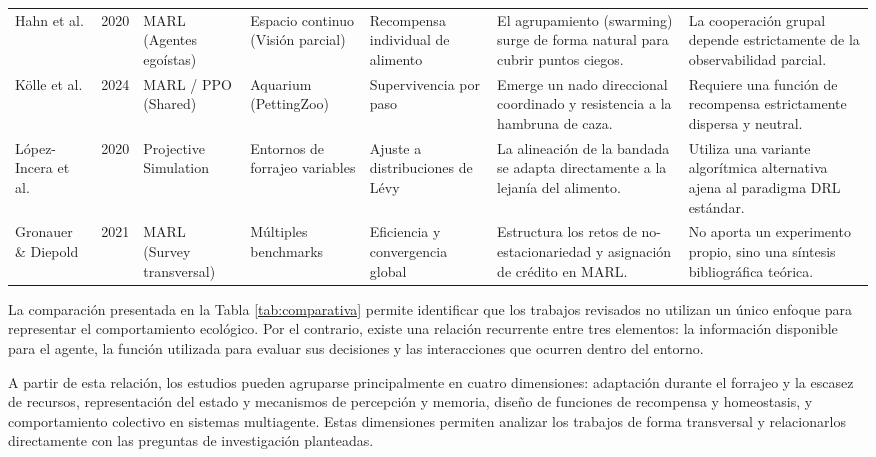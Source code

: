 \documentclass[conference]{IEEEtran}
\begin{document}
\begin{table}[tbp]
\begin{tabular}{p{1.6cm} c p{2.0cm} p{2.0cm} p{2.2cm} p{3.5cm} p{3.4cm}}
\addlinespace

Hahn et al. \cite{Paper18} &
2020 &
MARL (Agentes egoístas) &
Espacio continuo (Visión parcial) &
Recompensa individual de alimento &
El agrupamiento (swarming) surge de forma natural para cubrir puntos ciegos. &
La cooperación grupal depende estrictamente de la observabilidad parcial. \\

\addlinespace

Kölle et al. \cite{Paper19} &
2024 &
MARL / PPO (Shared) &
Aquarium (PettingZoo) &
Supervivencia por paso &
Emerge un nado direccional coordinado y resistencia a la hambruna de caza. &
Requiere una función de recompensa estrictamente dispersa y neutral. \\

\addlinespace

López-Incera et al. \cite{Paper20} &
2020 &
Projective Simulation &
Entornos de forrajeo variables &
Ajuste a distribuciones de Lévy &
La alineación de la bandada se adapta directamente a la lejanía del alimento. &
Utiliza una variante algorítmica alternativa ajena al paradigma DRL estándar. \\


\addlinespace

Gronauer \& Diepold \cite{Survey3} &
2021 &
MARL (Survey transversal) &
Múltiples benchmarks &
Eficiencia y convergencia global &
Estructura los retos de no-estacionariedad y asignación de crédito en MARL. &
No aporta un experimento propio, sino una síntesis bibliográfica teórica. \\

\bottomrule
\end{tabular}
\end{table}

La comparación presentada en la Tabla \ref{tab:comparativa} permite
identificar que los trabajos revisados no utilizan un único enfoque para
representar el comportamiento ecológico. Por el contrario, existe una
relación recurrente entre tres elementos: la información disponible para
el agente, la función utilizada para evaluar sus decisiones y las
interacciones que ocurren dentro del entorno.

A partir de esta relación, los estudios pueden agruparse principalmente
en cuatro dimensiones: adaptación durante el forrajeo y la escasez de
recursos, representación del estado y mecanismos de percepción y memoria,
diseño de funciones de recompensa y homeostasis, y comportamiento
colectivo en sistemas multiagente. Estas dimensiones permiten analizar los
trabajos de forma transversal y relacionarlos directamente con las
preguntas de investigación planteadas.
\end{document}
